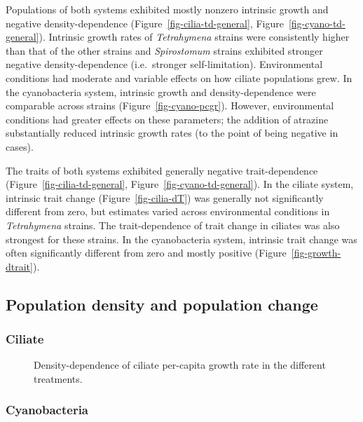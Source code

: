 \documentclass[
  letterpaper,
  DIV=11,
  numbers=noendperiod]{scrartcl}
\begin{document}
Populations of both systems exhibited mostly nonzero intrinsic growth
and negative density-dependence (Figure~\ref{fig-cilia-td-general},
Figure~\ref{fig-cyano-td-general}). Intrinsic growth rates of
\emph{Tetrahymena} strains were consistently higher than that of the
other strains and \emph{Spirostomum} strains exhibited stronger negative
density-dependence (i.e.~stronger self-limitation). Environmental
conditions had moderate and variable effects on how ciliate populations
grew. In the cyanobacteria system, intrinsic growth and
density-dependence were comparable across strains
(Figure~\ref{fig-cyano-pcgr}). However, environmental conditions had
greater effects on these parameters; the addition of atrazine
substantially reduced intrinsic growth rates (to the point of being
negative in cases).

The traits of both systems exhibited generally negative trait-dependence
(Figure~\ref{fig-cilia-td-general}, Figure~\ref{fig-cyano-td-general}).
In the ciliate system, intrinsic trait change
(Figure~\ref{fig-cilia-dT}) was generally not significantly different
from zero, but estimates varied across environmental conditions in
\emph{Tetrahymena} strains. The trait-dependence of trait change in
ciliates was also strongest for these strains. In the cyanobacteria
system, intrinsic trait change was often significantly different from
zero and mostly positive (Figure~\ref{fig-growth-dtrait}).

\subsection{Population density and population
change}\label{population-density-and-population-change}

\subsubsection{Ciliate}\label{ciliate-1}

\begin{figure}


\caption{\label{fig-cilia-pcgr}Density-dependence of ciliate per-capita
growth rate in the different treatments.}

\end{figure}%

\subsubsection{Cyanobacteria}\label{cyanobacteria-1}
\end{document}

